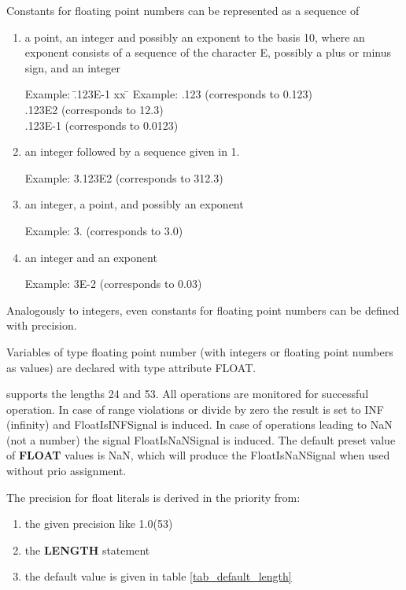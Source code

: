 Constants for floating point numbers can be represented as a sequence of
\begin{enumerate}
\item a point, an integer and possibly an exponent to the basis 10,
where an exponent consists of a sequence of the character E, possibly a
plus or minus sign, and an integer

\begin{tabbing}
Example: \= .123E-1 xx \=  \kill
Example: \> .123 \> (corresponds to 0.123)\\
 \> .123E2 \> (corresponds to 12.3)\\
 \> .123E-1 \> (corresponds to 0.0123)
\end{tabbing}

\item an integer followed by a sequence given in 1.

Example: 3.123E2 (corresponds to 312.3)

\item an integer, a point, and possibly an exponent

Example: 3. (corresponds to 3.0)

\item an integer and an exponent

Example: 3E-2 (corresponds to 0.03)
\end{enumerate}

Analogously to integers, even constants for floating point numbers can
be defined with precision.

Variables of type floating point number (with integers or floating point
numbers as values) are declared with type attribute FLOAT.




\OpenPEARL{} supports the lengths 24 and 53.
All operations are monitored for successful operation.
In case of range violations or
divide by zero the result is set to INF (infinity) and
FloatIsINFSignal is induced.
In case of operations leading to NaN (not a number) the signal
FloatIsNaNSignal is induced.
The default preset value of {\bf FLOAT} values is NaN, which will produce
the FloatIsNaNSignal when used without prio assignment.

The precision for float literals is derived in the priority from: 
\begin{enumerate}
\item the given precision like 1.0(53)
\item the {\bf LENGTH} statement
\item the default value is given in table \ref{tab_default_length}
\end{enumerate}

